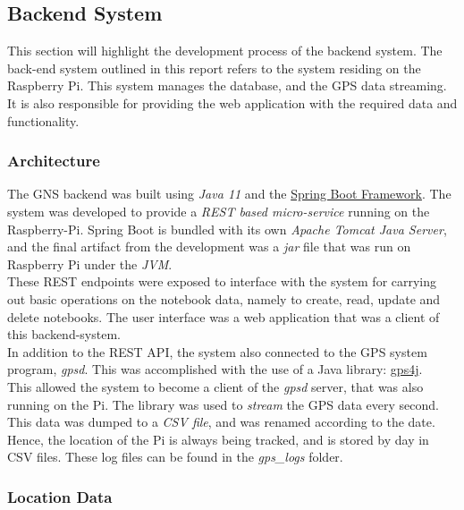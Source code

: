 
\subsection{Backend System}
This section will highlight the development process of the backend system. The back-end system outlined in this report refers to the system residing on the Raspberry Pi. This system manages the database, and the GPS data streaming. It is also responsible for providing the web application with the required data and functionality.\\

\subsubsection{Architecture}
The GNS backend was built using \textit{Java 11} and the \href{https://spring.io}{Spring Boot Framework}\cite{spring-boot}. The system was developed to provide a \textit{REST based micro-service} running on the Raspberry-Pi. Spring Boot is bundled with its own \textit{Apache Tomcat Java Server}\cite{apache-tomcat}, and the final artifact from the development was a \textit{jar} file that was run on Raspberry Pi under the \textit{JVM}.\\

These REST endpoints were exposed to interface with the system for carrying out basic operations on the notebook data, namely to create, read, update and delete notebooks. The user interface was a web application that was a client of this backend-system.\\

In addition to the REST API, the system also connected to the GPS system program, \textit{gpsd}. This was accomplished with the use of a Java library: \href{https://github.com/ivkos/gpsd4j}{gps4j}\cite{gpsd4j}.\\

This allowed the system to become a client of the \textit{gpsd} server, that was also running on the Pi. The library was used to \textit{stream} the GPS data every second. This data was dumped to a \textit{CSV file}, and was renamed according to the date. Hence, the location of the Pi is always being tracked, and is stored by day in CSV files. These log files can be found in the \textit{gps\_logs} folder.\\

\subsubsection{Location Data}

